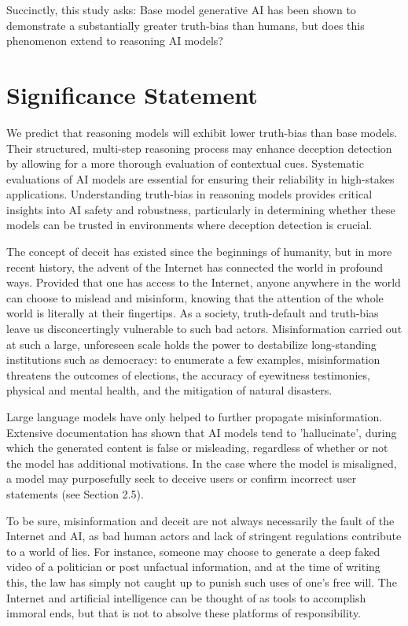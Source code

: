 \documentclass{article}
\begin{document}
Succinctly, this study asks: Base model generative AI has been shown to demonstrate a substantially greater truth-bias than humans, but does this phenomenon extend to reasoning AI models?

\section{Significance Statement}

We predict that reasoning models will exhibit lower truth-bias than base models. Their structured, multi-step reasoning process may enhance deception detection by allowing for a more thorough evaluation of contextual cues. Systematic evaluations of AI models are essential for ensuring their reliability in high-stakes applications. Understanding truth-bias in reasoning models provides critical insights into AI safety and robustness, particularly in determining whether these models can be trusted in environments where deception detection is crucial.

The concept of deceit has existed since the beginnings of humanity, but in more recent history, the advent of the Internet has connected the world in profound ways. Provided that one has access to the Internet, anyone anywhere in the world can choose to mislead and misinform, knowing that the attention of the whole world is literally at their fingertips. As a society, truth-default and truth-bias leave us disconcertingly vulnerable to such bad actors. Misinformation carried out at such a large, unforeseen scale holds the power to destabilize long-standing institutions such as democracy: to enumerate a few examples, misinformation threatens the outcomes of elections, the accuracy of eyewitness testimonies, physical and mental health, and the mitigation of natural disasters. 

Large language models have only helped to further propagate misinformation. Extensive documentation has shown that AI models tend to 'hallucinate', during which the generated content is false or misleading, regardless of whether or not the model has additional motivations. In the case where the model is misaligned, a model may purposefully seek to deceive users or confirm incorrect user statements (see Section 2.5). 

To be sure, misinformation and deceit are not always necessarily the fault of the Internet and AI, as bad human actors and lack of stringent regulations contribute to a world of lies. For instance, someone may choose to generate a deep faked video of a politician or post unfactual information, and at the time of writing this, the law has simply not caught up to punish such uses of one’s free will. The Internet and artificial intelligence can be thought of as tools to accomplish immoral ends, but that is not to absolve these platforms of responsibility.
\end{document}
